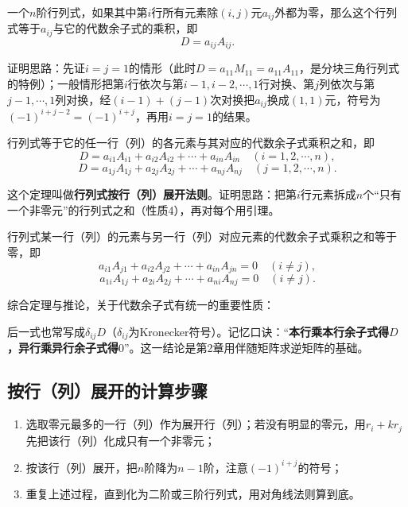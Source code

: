 \begin{lemma}
一个$n$阶行列式，如果其中第$i$行所有元素除$(i,j)$元$a_{ij}$外都为零，那么这个行列式等于$a_{ij}$与它的代数余子式的乘积，即
\[
D=a_{ij}A_{ij}.
\]
\end{lemma}

证明思路：先证$i=j=1$的情形（此时$D=a_{11}M_{11}=a_{11}A_{11}$，是分块三角行列式的特例）；一般情形把第$i$行依次与第$i-1,i-2,\cdots,1$行对换、第$j$列依次与第$j-1,\cdots,1$列对换，经$(i-1)+(j-1)$次对换把$a_{ij}$换成$(1,1)$元，符号为$(-1)^{i+j-2}=(-1)^{i+j}$，再用$i=j=1$的结果。

\begin{theorem}
行列式等于它的任一行（列）的各元素与其对应的代数余子式乘积之和，即
\[
D=a_{i1}A_{i1}+a_{i2}A_{i2}+\cdots+a_{in}A_{in}\quad(i=1,2,\cdots,n),
\]
\[
D=a_{1j}A_{1j}+a_{2j}A_{2j}+\cdots+a_{nj}A_{nj}\quad(j=1,2,\cdots,n).
\]
\end{theorem}

这个定理叫做\textbf{行列式按行（列）展开法则}。证明思路：把第$i$行元素拆成$n$个“只有一个非零元”的行列式之和（性质4），再对每个用引理。

\begin{corollary}
行列式某一行（列）的元素与另一行（列）对应元素的代数余子式乘积之和等于零，即
\[
a_{i1}A_{j1}+a_{i2}A_{j2}+\cdots+a_{in}A_{jn}=0\quad(i\neq j),
\]
\[
a_{1i}A_{1j}+a_{2i}A_{2j}+\cdots+a_{ni}A_{nj}=0\quad(i\neq j).
\]
\end{corollary}

综合定理与推论，关于代数余子式有统一的重要性质：

后一式也常写成$\delta_{ij}D$（$\delta_{ij}$为Kronecker符号）。记忆口诀：“\textbf{本行乘本行余子式得$D$，异行乘异行余子式得$0$}”。这一结论是第2章用伴随矩阵求逆矩阵的基础。

\subsection{按行（列）展开的计算步骤}

\begin{enumerate}
\item 选取零元最多的一行（列）作为展开行（列）；若没有明显的零元，用$r_i+kr_j$先把该行（列）化成只有一个非零元；
\item 按该行（列）展开，把$n$阶降为$n-1$阶，注意$(-1)^{i+j}$的符号；
\item 重复上述过程，直到化为二阶或三阶行列式，用对角线法则算到底。
\end{enumerate}

